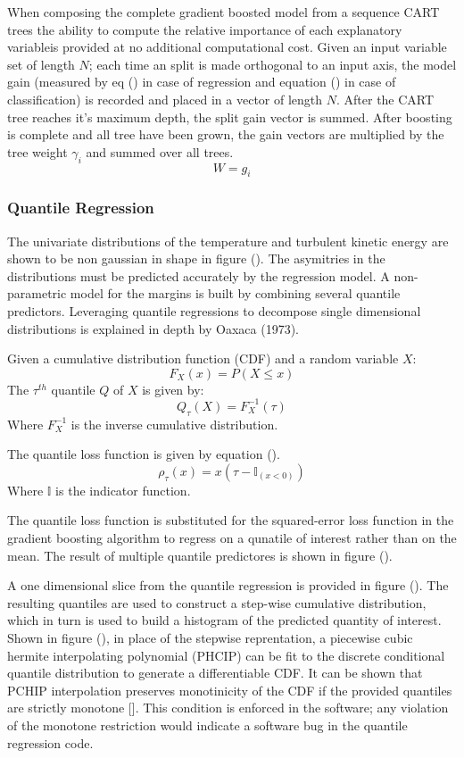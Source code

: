 When composing the complete gradient boosted model from a sequence CART trees the ability to compute the relative importance of each explanatory variableis provided at no additional computational cost.  Given an input variable set of length $N$; each time an split is made orthogonal to an input axis, the model gain (measured by eq () in case of regression and equation () in case of classification) is recorded and placed in a vector of length $N$.  After the CART tree reaches it's maximum depth, the split gain vector is summed.  After boosting is complete and all tree have been grown, the gain vectors are multiplied by the tree weight $\gamma_i$ and summed over all trees.
\begin{equation}
W = g_i
\end{equation}

\subsubsection{Quantile Regression}

The univariate distributions of the temperature and turbulent kinetic energy are shown to be non gaussian in shape in figure ().  The asymitries in the distributions must be predicted accurately by the regression model.  A non-parametric model for the margins is built by combining several quantile predictors.  Leveraging quantile regressions to decompose single dimensional distributions is explained in depth by Oaxaca (1973).

Given a cumulative distribution function (CDF) and a random variable $X$:
\begin{equation}
F_X(x) = P(X \leq x)
\end{equation}
The $\tau^{th}$ quantile $Q$ of $X$ is given by:
\begin{equation}
Q_\tau(X) = F_X^{-1}(\tau)
\end{equation}
Where $F_X^{-1}$ is the inverse cumulative distribution.

The quantile loss function is given by equation ().
\begin{equation}
\rho_\tau(x) = x(\tau - \mathbb{I}_{(x < 0)})
\end{equation}
Where $\mathbb{I}$ is the indicator function.

The quantile loss function is substituted for the squared-error loss function in the gradient boosting algorithm to regress on a qunatile of interest rather than on the mean.  The result of multiple quantile predictores is shown in figure (). 

A one dimensional slice from the quantile regression is provided in figure ().
The resulting quantiles are used to construct a step-wise cumulative distribution, which in turn is used to build a histogram of the predicted quantity of interest. 
Shown in figure (), in place of the stepwise reprentation, a piecewise cubic hermite interpolating polynomial (PHCIP) can be fit to the discrete conditional quantile distribution to generate a differentiable CDF.
It can be shown that PCHIP interpolation preserves monotinicity of the CDF if the provided quantiles are strictly monotone [].  This condition is enforced in the software; any violation of the monotone restriction would indicate a software bug in the quantile regression code.
